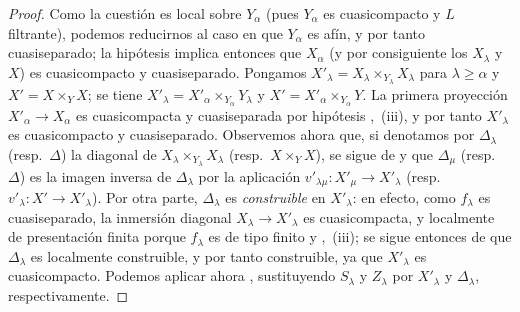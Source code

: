 \begin{proof}
Como la cuestión es local sobre $Y_\alpha$ (pues $Y_\alpha$ es cuasicompacto y $L$ filtrante), podemos reducirnos al caso en que $Y_\alpha$ es afín, y por tanto cuasiseparado; la hipótesis implica entonces que $X_\alpha$ (y por consiguiente los $X_\lambda$ y $X$) es cuasicompacto y cuasiseparado.
Pongamos $X'_\lambda=X_\lambda\times_{Y_\lambda}X_\lambda$ para $\lambda\geqslant\alpha$ y $X'=X\times_Y X$; se tiene $X'_\lambda=X'_\alpha\times_{Y_\alpha}Y_\lambda$ y $X'=X'_\alpha\times_{Y_\alpha}Y$. La primera proyección $X'_\alpha\to X_\alpha$ es cuasicompacta y cuasiseparada por hipótesis ,~(iii), y por tanto $X'_\lambda$ es cuasicompacto y cuasiseparado.
Observemos ahora que, si denotamos por $\Delta_\lambda$ (resp.\ $\Delta$) la diagonal de $X_\lambda\times_{Y_\lambda}X_\lambda$ (resp.\ $X\times_Y X$), se sigue de  y  que $\Delta_\mu$ (resp.\ $\Delta$) es la imagen inversa de $\Delta_\lambda$ por la aplicación $v'_{\lambda\mu}:X'_\mu\to X'_\lambda$ (resp.\ $v'_\lambda:X'\to X'_\lambda$).
Por otra parte, $\Delta_\lambda$ es \emph{construible} en $X'_\lambda$: en efecto, como $f_\lambda$ es cuasiseparado, la inmersión diagonal $X_\lambda\to X'_\lambda$ es cuasicompacta, y localmente de presentación finita porque $f_\lambda$ es de tipo finito  y ,~(iii); se sigue entonces de  que $\Delta_\lambda$ es localmente construible, y por tanto construible, ya que $X'_\lambda$ es cuasicompacto.
Podemos aplicar ahora , sustituyendo $S_\lambda$ y $Z_\lambda$ por $X'_\lambda$ y $\Delta_\lambda$, respectivamente.
\end{proof}

